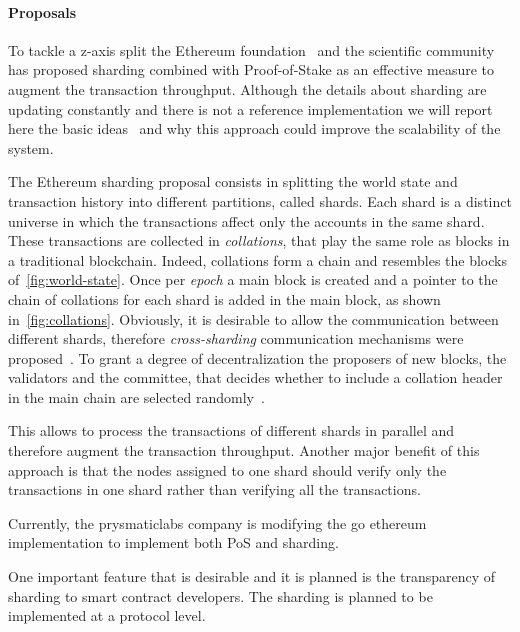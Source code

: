 \paragraph{Proposals} To tackle a z-axis split the Ethereum 
foundation~\cite{bib:mauve} and the scientific 
community~\cite{bib:scaling-croman} has proposed sharding combined with
Proof-of-Stake as an effective measure to augment the transaction throughput.
Although the details about sharding are updating constantly and there is not
a reference implementation we will report here the basic ideas~\cite{bib:mauve,bib:sharding-faq} and why this
approach could improve the scalability of the system.

The Ethereum sharding proposal consists in splitting the world state and
transaction history into different partitions, called shards.
Each shard is a distinct universe in which the transactions affect only the 
accounts in the same shard. These transactions are collected in 
\emph{collations}, that play the same role as blocks in a traditional  
blockchain. Indeed, collations form a chain and resembles the blocks 
of~\autoref{fig:world-state}. Once per \emph{epoch} a main block is created
and a pointer to the chain of collations for each shard is added in the main
block, as shown in~\autoref{fig:collations}.
Obviously, it is desirable to allow the communication between different shards,
therefore \emph{cross-sharding} communication mechanisms were 
proposed~\cite{bib:sharding-faq}. To grant a degree of decentralization the 
proposers of new blocks, the validators and the committee, that decides whether 
to include a collation header in the main chain are selected randomly~\cite{}.

This allows to process the transactions of different shards in parallel
and therefore augment the transaction throughput. Another major benefit of this
approach is that the nodes assigned to one shard should verify only the 
transactions in one shard rather than verifying all the transactions.




Currently, the prysmaticlabs company is modifying the go ethereum implementation
to implement both PoS and sharding.

One important feature that is desirable and it is planned is the transparency
of sharding to smart contract developers. The sharding is planned to be 
implemented at a protocol level.



